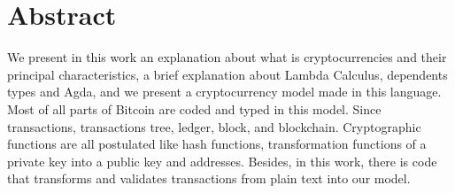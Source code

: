 \section{Abstract}

We present in this work an explanation about what is cryptocurrencies and their principal characteristics,
a brief explanation about Lambda Calculus, dependents types and Agda,
and we present a cryptocurrency model made in this language.
Most of all parts of Bitcoin are coded and typed in this model.
Since transactions, transactions tree, ledger, block, and blockchain.
Cryptographic functions are all postulated like hash functions,
transformation functions of a private key into a public key and addresses.
Besides, in this work, there is code that transforms and validates transactions
from plain text into our model.
